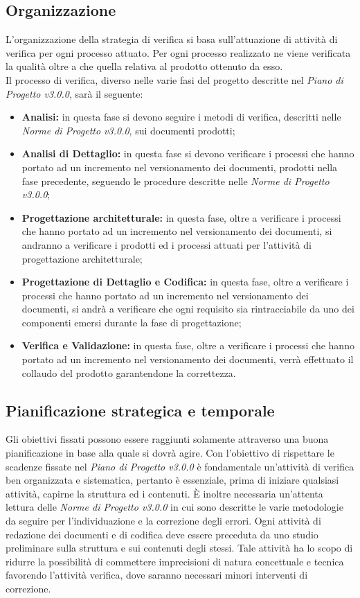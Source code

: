 \subsection{Organizzazione}
L'organizzazione della strategia di verifica si basa sull'attuazione di attività di verifica per ogni processo attuato. Per ogni processo realizzato ne viene verificata la qualità oltre a che quella relativa al prodotto ottenuto da esso.\\
Il processo di verifica, diverso nelle varie fasi del progetto descritte nel \textit{Piano di Progetto v3.0.0}, sarà il seguente:
\begin{itemize}
	\item \textbf{Analisi:} in questa fase si devono seguire i metodi di verifica, descritti nelle \textit{Norme di Progetto v3.0.0}, sui documenti prodotti;
	\item \textbf{Analisi di Dettaglio:} in questa fase si devono verificare i processi che hanno portato ad un incremento nel \gls{versionamento} dei documenti, prodotti nella fase precedente, seguendo le procedure descritte nelle \textit{Norme di Progetto v3.0.0};
	\item \textbf{Progettazione architetturale:} in questa fase, oltre a verificare i processi che hanno portato ad un incremento nel \gls{versionamento} dei documenti, si andranno a verificare i prodotti ed i processi attuati per l'attività di progettazione architetturale;
	\item \textbf{Progettazione di Dettaglio e Codifica:} in questa fase, oltre a verificare i processi che hanno portato ad un incremento nel \gls{versionamento} dei documenti, si andrà a verificare che ogni requisito sia rintracciabile da uno dei componenti emersi durante la fase di progettazione;
	\item \textbf{Verifica e Validazione:} in questa fase, oltre a verificare i processi che hanno portato ad un incremento nel \gls{versionamento} dei documenti, verrà effettuato il collaudo del prodotto garantendone la correttezza.
\end{itemize} 

\subsection{Pianificazione strategica e temporale}
Gli obiettivi fissati possono essere raggiunti solamente attraverso una buona pianificazione in base alla quale si dovrà agire. Con l'obiettivo di rispettare le scadenze fissate nel \textit{Piano di Progetto v3.0.0} è fondamentale un'attività di verifica ben organizzata e sistematica, pertanto è essenziale, prima di iniziare qualsiasi attività, capirne la struttura ed i contenuti. È inoltre necessaria un'attenta lettura delle \textit{Norme di Progetto v3.0.0} in cui sono descritte le varie metodologie da seguire per l'individuazione e la correzione degli errori. Ogni attività di redazione dei documenti e di codifica deve essere preceduta da uno studio preliminare sulla struttura e sui contenuti degli stessi. Tale attività ha lo scopo di ridurre la possibilità di commettere imprecisioni di natura concettuale e tecnica favorendo l'attività verifica, dove saranno necessari minori interventi di correzione.

